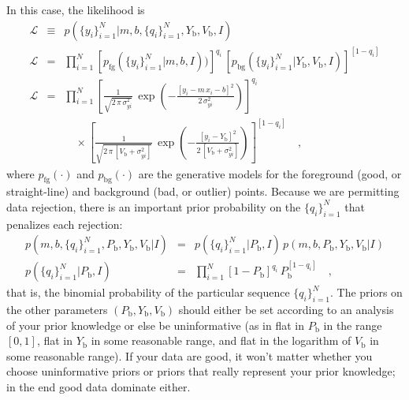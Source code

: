 \documentclass[12pt,twoside,pdftex]{article}
\newcommand{\setofall}[3]{\{{#1}\}_{{#2}}^{{#3}}}
\newcommand{\allq}{\setofall{q_i}{i=1}{N}}
\newcommand{\ally}{\setofall{y_i}{i=1}{N}}
\newcommand{\like}{\mathscr{L}}
\newcommand{\pfg}{p_{\mathrm{fg}}}
\newcommand{\pbg}{p_{\mathrm{bg}}}
\newcommand{\Pbad}{P_{\mathrm{b}}}
\newcommand{\Ybad}{Y_{\mathrm{b}}}
\newcommand{\Vbad}{V_{\mathrm{b}}}
\begin{document}
In this case, the likelihood is
\begin{eqnarray}\displaystyle
\like &\equiv& p(\ally|m,b,\allq,\Ybad,\Vbad,I)
 \nonumber\\
\like &=& \prod_{i=1}^N
 \left[\pfg(\ally|m,b,I))\right]^{q_i}\,
 \left[\pbg(\ally|\Ybad,\Vbad,I)\right]^{[1-q_i]}
 \nonumber\\
\like &=& \prod_{i=1}^N \left[\frac{1}{\sqrt{2\,\pi\,\sigma_{yi}^2}}
 \,\exp\left(-\frac{[y_i-m\,x_i-b]^2}{2\,\sigma_{yi}^2}\right)\right]^{q_i}
 \nonumber \\ & & \quad\times
 \left[\frac{1}{\sqrt{2\,\pi\,[\Vbad+\sigma_{yi}^2]}}
 \,\exp\left(-\frac{[y_i-\Ybad]^2}{2\,[\Vbad+\sigma_{yi}^2]}\right)\right]^{[1-q_i]}
 \quad ,
\end{eqnarray}
where $\pfg(\cdot)$ and $\pbg(\cdot)$ are the generative models for
the foreground (good, or straight-line) and background (bad, or
outlier) points.  Because we are permitting data rejection, there is
an important prior probability on the $\allq$ that penalizes each
rejection:
\begin{eqnarray}\displaystyle
p(m,b,\allq,\Pbad,\Ybad,\Vbad|I)
 &=& p(\allq|\Pbad,I)\,p(m,b,\Pbad,\Ybad,\Vbad|I)
 \nonumber\\
p(\allq|\Pbad,I)
 &=& \prod_{i=1}^N[1-\Pbad]^{q_i}\,\Pbad^{[1-q_i]}
 \quad ,
\end{eqnarray}
that is, the binomial probability of the particular sequence $\allq$.
The priors on the other parameters $(\Pbad,\Ybad,\Vbad)$ should either
be set according to an analysis of your prior knowledge or else be
uninformative (as in flat in $\Pbad$ in the range $[0,1]$, flat in
$\Ybad$ in some reasonable range, and flat in the logarithm of $\Vbad$
in some reasonable range).  If your data are good, it won't matter
whether you choose uninformative priors or priors that really
represent your prior knowledge; in the end good data dominate either.
\end{document}
